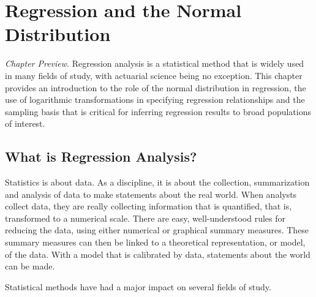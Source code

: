 
\setcounter{chapter}{0}
\chapter{Regression and the Normal Distribution}

{\small \textit{Chapter Preview}. Regression analysis is a
statistical method that is widely used in many fields of study, with
actuarial science being no exception. This chapter provides an
introduction to the role of the normal distribution in regression,
the use of logarithmic transformations in specifying regression
relationships and the sampling basis that is critical for inferring
regression results to broad populations of interest.}

\section{What is Regression Analysis?}\label{S1:Intro}

Statistics is about data. As a discipline, it is about the
collection, summarization and analysis of data to make statements
about the real world. When analysts collect data, they are really
collecting information that is quantified, that is, transformed to a
numerical scale. There are easy, well-understood rules for reducing
the data, using either numerical or graphical summary measures.
These summary measures can then be linked to a theoretical
representation, or model, of the data. With a model that is
calibrated by data, statements about the world can be made.


Statistical methods have had a major impact on several fields of study.

